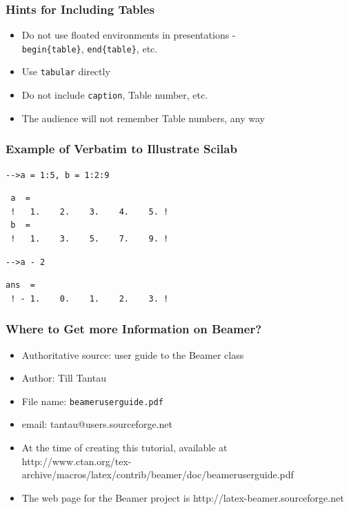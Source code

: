 \begin{frame}
\frametitle{Hints for Including Tables}
\begin{itemize}
\item<+-> Do not use floated environments in
  presentations 
  - \\ {\tt begin\{table\}}, {\tt end\{table\}}, 
  etc. 
\item<+-> Use {\tt tabular} directly
\item<+-> Do not include {\tt caption}, Table
  number, etc.
\item<+-> The audience will not remember Table
  numbers, any way
\end{itemize}
\end{frame}



\begin{frame}[fragile]
\frametitle{Example of Verbatim to Illustrate Scilab}
\begin{verbatim}
-->a = 1:5, b = 1:2:9
\end{verbatim}
{\color{blue}
\begin{verbatim}
 a  =
 !   1.    2.    3.    4.    5. !
 b  =
 !   1.    3.    5.    7.    9. !
\end{verbatim}}

\begin{verbatim}
-->a - 2
\end{verbatim}
{\color{blue}
\begin{verbatim}
ans  =
 ! - 1.    0.    1.    2.    3. !
\end{verbatim} }
\end{frame}

\begin{frame}
\frametitle{Where to Get more Information on
  Beamer?} 
\begin{itemize}
\item<+-|alert@+> Authoritative source: user guide to the Beamer class
\item<+-|alert@+> Author: Till Tantau
\item<+-|alert@+> File name: 
  {\color{magenta} \tt beameruserguide.pdf} 
\item<+-|alert@+> email: tantau@users.sourceforge.net 
\item<+-|alert@+> At the time of creating this
  tutorial, available at \\
{\color{magenta} \small http://www.ctan.org/tex-archive/macros/latex/contrib/beamer/doc/beameruserguide.pdf}
\item<+-|alert@+> The web page for the Beamer
  project is
{\color{magenta} http://latex-beamer.sourceforge.net}
\end{itemize}
\end{frame}


